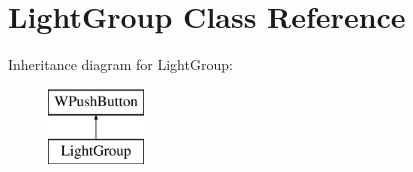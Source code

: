 \hypertarget{class_light_group}{}\section{Light\+Group Class Reference}
\label{class_light_group}
Inheritance diagram for Light\+Group\+:\begin{figure}[H]
\begin{center}
\leavevmode
\includegraphics[height=2.000000cm]{class_light_group}
\end{center}
\end{figure}
